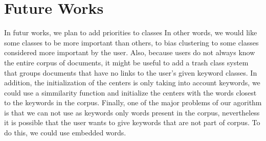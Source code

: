 \section{Future Works}
In futur works, we plan to add priorities to classes In other words, we would like some classes
to be more important than others, to bias clustering to some classes considered more
important by the user. Also, because users do not always know the entire corpus of
documents, it might be useful to add a trash class system that groups documents
that have no links to the user's given keyword classes. In addition, the
initialization of the centers is only taking into account keywords, we could use
a simmilarity function and initialize the centers with the words closest to the
keywords in the corpus. Finally, one of the major problems of our agorithm is
that we can not use as keywords only words present in the corpus, nevertheless
it is possible that the user wants to give keywords that are not part of corpus.
To do this, we could use embedded words.